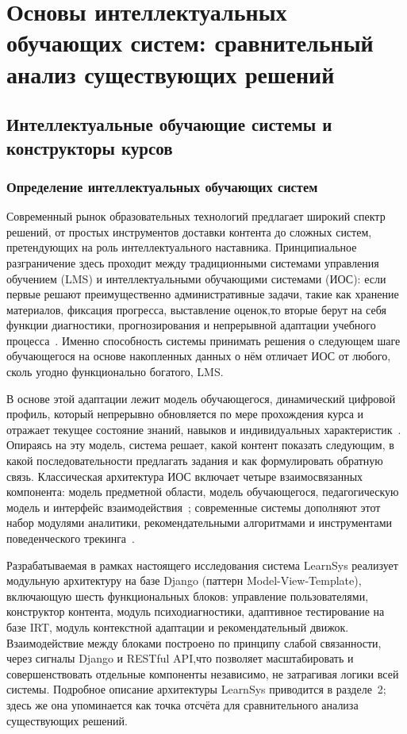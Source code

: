 \section{Основы интеллектуальных обучающих систем: 
сравнительный анализ существующих решений}

\subsection{Интеллектуальные обучающие системы и конструкторы курсов}

\subsubsection{Определение интеллектуальных обучающих систем}

Современный рынок образовательных технологий предлагает широкий
спектр решений, от простых инструментов доставки контента до
сложных систем, претендующих на роль интеллектуального наставника.
Принципиальное разграничение здесь проходит между традиционными
системами управления обучением (LMS) и интеллектуальными
обучающими системами (ИОС): если первые решают преимущественно
административные задачи, такие как хранение материалов, фиксация
прогресса, выставление оценок,то вторые берут на себя
функции диагностики, прогнозирования и непрерывной адаптации
учебного процесса~\cite{brusilovsky2001adaptive}. Именно
способность системы принимать решения о следующем шаге
обучающегося на основе накопленных данных о нём отличает ИОС
от любого, сколь угодно функционально богатого, LMS.

В основе этой адаптации лежит модель обучающегося, динамический
цифровой профиль, который непрерывно обновляется по мере
прохождения курса и отражает текущее состояние знаний, навыков
и индивидуальных характеристик~\cite{brusilovsky2007usermodels}.
Опираясь на эту модель, система решает, какой контент показать
следующим, в какой последовательности предлагать задания и как
формулировать обратную связь. Классическая архитектура ИОС
включает четыре взаимосвязанных компонента: модель предметной
области, модель обучающегося, педагогическую модель и интерфейс
взаимодействия~\cite{woolf2009building}; современные системы
дополняют этот набор модулями аналитики, рекомендательными
алгоритмами и инструментами поведенческого
трекинга~\cite{ifenthaler2020learning, conati2002bayesian}.

Разрабатываемая в рамках настоящего исследования система LearnSys
реализует модульную архитектуру на базе Django
(паттерн Model-View-Template), включающую шесть функциональных
блоков: управление пользователями, конструктор контента, модуль
психодиагностики, адаптивное тестирование на базе IRT, модуль
контекстной адаптации и рекомендательный движок. Взаимодействие
между блоками построено по принципу слабой связанности, через
сигналы Django и RESTful API,что позволяет масштабировать
и совершенствовать отдельные компоненты независимо, не затрагивая
логики всей системы. Подробное описание архитектуры LearnSys
приводится в разделе~2; здесь же она упоминается как точка
отсчёта для сравнительного анализа существующих решений.

